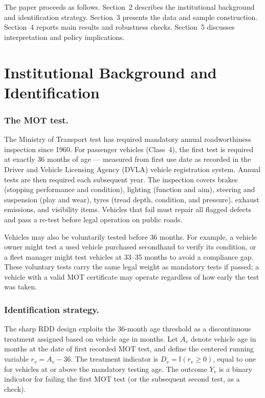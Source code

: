 \documentclass[12pt]{article}
\begin{document}
The paper proceeds as follows. Section~2 describes the institutional background and identification strategy. Section~3 presents the data and sample construction. Section~4 reports main results and robustness checks. Section~5 discusses interpretation and policy implications.

\section{Institutional Background and Identification}

\subsubsection*{The MOT test.}
The Ministry of Transport test has required mandatory annual roadworthiness inspection since 1960. For passenger vehicles (Class~4), the first test is required at exactly 36 months of age --- measured from first use date as recorded in the Driver and Vehicle Licensing Agency (DVLA) vehicle registration system. Annual tests are then required each subsequent year. The inspection covers brakes (stopping performance and condition), lighting (function and aim), steering and suspension (play and wear), tyres (tread depth, condition, and pressure), exhaust emissions, and visibility items. Vehicles that fail must repair all flagged defects and pass a re-test before legal operation on public roads.

Vehicles may also be voluntarily tested before 36 months. For example, a vehicle owner might test a used vehicle purchased secondhand to verify its condition, or a fleet manager might test vehicles at 33--35 months to avoid a compliance gap. These voluntary tests carry the same legal weight as mandatory tests if passed; a vehicle with a valid MOT certificate may operate regardless of how early the test was taken.

\subsubsection*{Identification strategy.}
The sharp RDD design exploits the 36-month age threshold as a discontinuous treatment assigned based on vehicle age in months. Let $A_v$ denote vehicle age in months at the date of first recorded MOT test, and define the centered running variable $r_v = A_v - 36$. The treatment indicator is $D_v = \mathbb{I}(r_v \geq 0)$, equal to one for vehicles at or above the mandatory testing age. The outcome $Y_v$ is a binary indicator for failing the first MOT test (or the subsequent second test, as a check).
\end{document}
